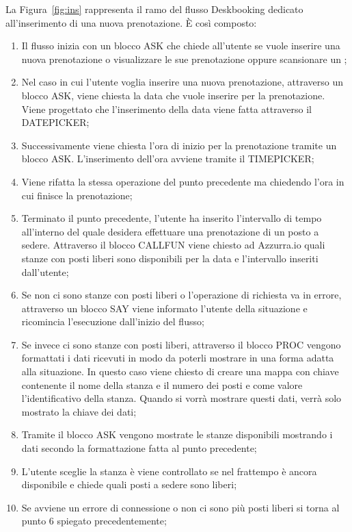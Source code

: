 La Figura~\ref{fig:ins} rappresenta il ramo del flusso Deskbooking dedicato all'inserimento di una nuova prenotazione. È così composto:
\begin{enumerate}
	\item Il flusso inizia con un blocco ASK che chiede all'utente se vuole inserire una nuova prenotazione o visualizzare le sue prenotazione oppure scansionare un ;
	\item Nel caso in cui l'utente voglia inserire una nuova prenotazione, attraverso un blocco ASK, viene chiesta la data che vuole inserire per la prenotazione. Viene progettato che l'inserimento della data viene fatta attraverso il DATEPICKER;
	\item Successivamente viene chiesta l'ora di inizio per la prenotazione tramite un blocco ASK. L'inserimento dell'ora avviene tramite il TIMEPICKER;
	\item Viene rifatta la stessa operazione del punto precedente ma chiedendo l'ora in cui finisce la prenotazione;
	\item Terminato il punto precedente, l'utente ha inserito l'intervallo di tempo all'interno del quale desidera effettuare una prenotazione di un posto a sedere. Attraverso il blocco CALLFUN viene chiesto ad Azzurra.io quali stanze con posti liberi sono disponibili per la data e l'intervallo inseriti dall'utente;
	\item Se non ci sono stanze con posti liberi o l'operazione di richiesta va in errore, attraverso un blocco SAY viene informato l'utente della situazione e ricomincia l'esecuzione dall'inizio del flusso;
	\item Se invece ci sono stanze con posti liberi, attraverso il blocco PROC vengono formattati i dati ricevuti in modo da poterli mostrare in una forma adatta alla situazione. In questo caso viene chiesto di creare una mappa con chiave contenente il nome della stanza e il numero dei posti e come valore l'identificativo della stanza. Quando si vorrà mostrare questi dati, verrà solo mostrato la chiave dei dati;
	\item Tramite il blocco ASK vengono mostrate le stanze disponibili mostrando i dati secondo la formattazione fatta al punto precedente;
	\item L'utente sceglie la stanza è viene controllato se nel frattempo è ancora disponibile e chiede quali posti a sedere sono liberi;
	\item Se avviene un errore di connessione o non ci sono più posti liberi si torna al punto 6 spiegato precedentemente;

\end{enumerate}
